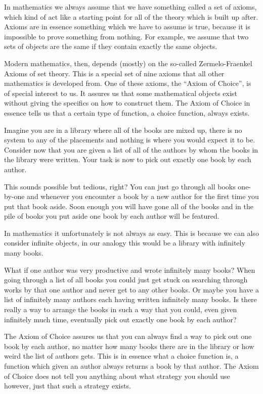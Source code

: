 \documentclass[../../main.tex]{subfiles}
\begin{document}
In mathematics we always assume that we have something called a set of axioms, 
which kind of act like a starting point for all of the theory which is built up after.
Axioms are in essence something which we have to assume is true, because it is impossible to prove something from nothing.
For example, we assume that two sets of objects are the same if they contain exactly the same objects.

Modern mathematics, then, depends (mostly) on the so-called Zermelo-Fraenkel Axioms of set theory.
This is a special set of nine axioms that all other mathematics is developed from.
One of these axioms, the ``Axiom of Choice'', is of special interest to us.
It assures us that some mathematical objects exist without giving the specifics on how to construct them.
The Axiom of Choice in essence tells us that a certain type of function, a choice function, always exists.

Imagine you are in a library where all of the books are mixed up, there is no system to any of the placements and nothing is where you would expect it to be.
Consider now that you are given a list of all of the authors by whom the books in the library were written.
Your task is now to pick out exactly one book by each author.

This sounds possible but tedious, right? 
You can just go through all books one-by-one and whenever you encounter a book by a new author for the first time you put that book aside.
Soon enough you will have gone all of the books and in the pile of books you put aside one book by each author will be featured.

In mathematics it unfortunately is not always as easy.
This is because we can also consider infinite objects, in our analogy this would be a library with infinitely many books.

What if one author was very productive and wrote infinitely many books?
When going through a list of all books you could just get stuck on searching through works by that one author and never get to any other books.
Or maybe you have a list of infinitely many authors each having written infinitely many books.
Is there really a way to arrange the books in such a way that you could, even given infinitely much time, eventually pick out exactly one book by each author?

The Axiom of Choice assures us that you can always find a way to pick out one book by each author, 
no matter how many books there are in the library or how weird the list of authors gets.
This is in essence what a choice function is, a function which given an author always returns a book by that author.
The Axiom of Choice does not tell you anything about what strategy you should use however, just that such a strategy exists.
\end{document}
